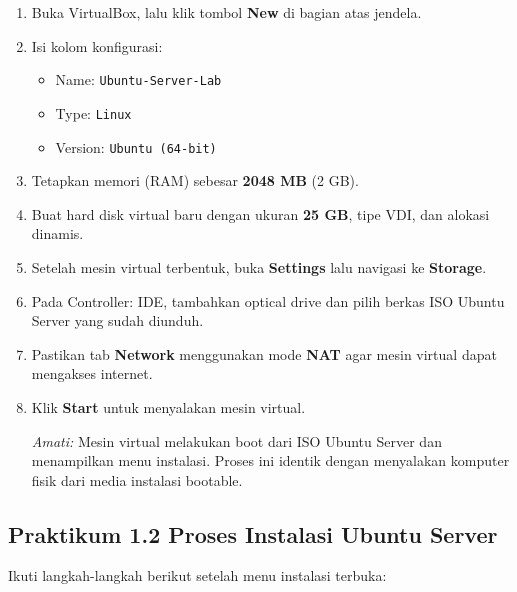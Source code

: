 \begin{enumerate}
    \item Buka VirtualBox, lalu klik tombol \textbf{New} di bagian atas jendela.
    \item Isi kolom konfigurasi:
    \begin{itemize}
        \item Name: \texttt{Ubuntu-Server-Lab}
        \item Type: \texttt{Linux}
        \item Version: \texttt{Ubuntu (64-bit)}
    \end{itemize}
    \item Tetapkan memori (RAM) sebesar \textbf{2048 MB} (2 GB).
    \item Buat hard disk virtual baru dengan ukuran \textbf{25 GB}, tipe VDI, dan
    alokasi dinamis.
    \item Setelah mesin virtual terbentuk, buka \textbf{Settings} lalu navigasi ke
    \textbf{Storage}.
    \item Pada Controller: IDE, tambahkan optical drive dan pilih berkas ISO Ubuntu
    Server yang sudah diunduh.
    \item Pastikan tab \textbf{Network} menggunakan mode \textbf{NAT} agar mesin virtual
    dapat mengakses internet.
    \item Klik \textbf{Start} untuk menyalakan mesin virtual.

    \textit{Amati:} Mesin virtual melakukan boot dari ISO Ubuntu Server dan menampilkan
    menu instalasi. Proses ini identik dengan menyalakan komputer fisik dari media
    instalasi bootable.
\end{enumerate}

\subsection*{Praktikum 1.2 Proses Instalasi Ubuntu Server}

Ikuti langkah-langkah berikut setelah menu instalasi terbuka:

